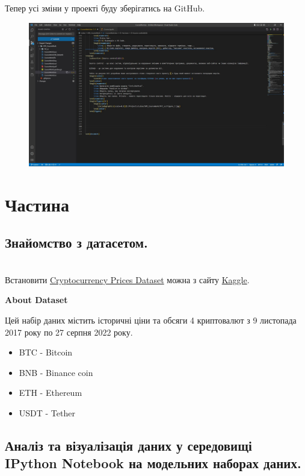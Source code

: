 \documentclass[a4paper,12pt]{article}
\begin{document}
\newpage
    Тепер усі зміни у проекті буду зберігатись на GitHub.
    \begin{figure}[h!]
        \begin{center}
            \includegraphics[scale=0.35]{Prt sc/Figure_8.jpg}
        \end{center}
    \end{figure}





\newpage
    \section{Частина}
    \subsection {Знайомство з датасетом.}
    \hrulefill \\
    Встановити \href{https://www.kaggle.com/datasets/thedevastator/get-your-game-on-metacritic-recommendations-and}{Cryptocurrency Prices Dataset} можна з сайту 
    \href{https://www.kaggle.com/}{Kaggle}.
    \begin{center}
        \textbf{About Dataset}
    \end{center}
    Цей набір даних містить історичні ціни та обсяги 4 криптовалют з 9 листопада 2017 року по 27 серпня 2022 року.
    \begin{itemize}
        \item BTC - Bitcoin
        \item BNB - Binance coin
        \item ETH - Ethereum
        \item USDT - Tether
    \end{itemize}
    
\newpage
    \subsection {Аналіз та візуалізація даних у середовищі IPython Notebook на модельних наборах даних.}
    \hrulefill \\
    
\end{document}
